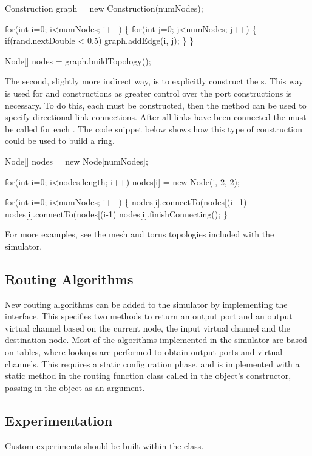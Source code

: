 \documentclass[10pt,a4paper]{article}
\begin{document}
\begin{egcode}
Construction graph = new Construction(numNodes);

for(int i=0; i<numNodes; i++) \{
    for(int j=0; j<numNodes; j++) \{
        if(rand.nextDouble < 0.5)
            graph.addEdge(i, j);
    \}
\}

Node[] nodes = graph.buildTopology();
\end{egcode}

The second, slightly more indirect way, is to explicitly construct the
s. This way is used for  and  constructions as
greater control over the port constructions is necessary. To do this, each
 must be constructed, then the  method can be used to
specify directional link connections. After all links have been connected the
 must be called for each .  The code snippet
below shows how this type of construction could be used to build a ring.

\begin{egcode}
Node[] nodes = new Node[numNodes];

for(int i=0; i<nodes.length; i++)
    nodes[i] = new Node(i, 2, 2);

for(int i=0; i<numNodes; i++) \{
    nodes[i].connectTo(nodes[(i+1) %
    nodes[i].connectTo(nodes[(i-1) %
    nodes[i].finishConnecting();
\}
\end{egcode}

\noindent
For more examples, see the mesh and torus topologies included with the
simulator.

\subsection{Routing Algorithms}

New routing algorithms can be added to the simulator by implementing
the  interface. This specifies two methods to return an
output port and an output virtual channel based on the current node, the input
virtual channel and the destination node. Most of the algorithms implemented in
the simulator are based on tables, where lookups are performed to obtain output
ports and virtual channels. This requires a static configuration phase, and is
implemented with a static method in the routing function class called in the
 object's constructor, passing in the  object as an
argument.

\subsection{Experimentation}

Custom experiments should be built within the  class.

\nocite{*}


\end{document}
